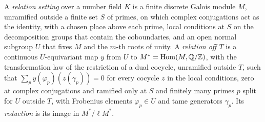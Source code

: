 A \emph{relation setting} over a number field $K$ is a finite discrete Galois module $M$, unramified outside a finite set $S$ of primes, on which complex conjugations act as the identity, with a chosen place above each prime,
local conditions at $S$ on the decomposition groups that contain the coboundaries, and an open normal subgroup $U$ that fixes $M$ and the $m$-th roots of unity. A \emph{relation off $T$} is a continuous $U$-equivariant map
$y$ from $U$ to $M^*=\operatorname{Hom}(M,\mathbb{Q}/\mathbb{Z})$, with the transformation law of the restriction of a dual cocycle, unramified outside $T$, such that $\sum_py(\varphi_p)(z(\gamma_p))=0$ for every cocycle $z$ in the local conditions, zero at complex
conjugations and ramified only at $S$ and finitely many primes $p$ split for $U$ outside $T$, with Frobenius elements $\varphi_p\in U$ and tame generators $\gamma_p$. Its \emph{reduction} is its image in $M^*/\ell M^*$.
